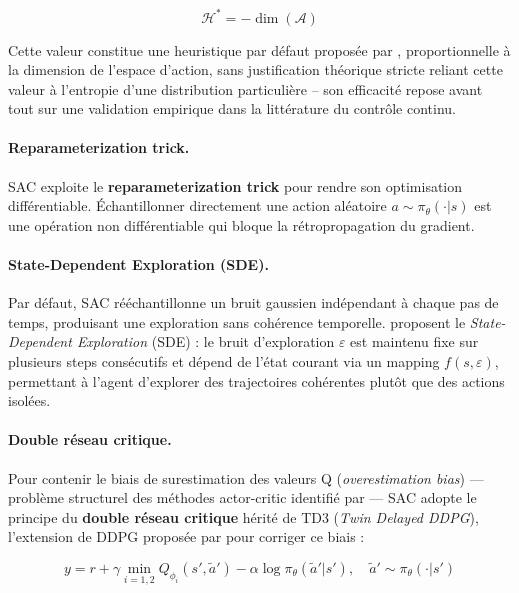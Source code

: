 \begin{equation}
    \mathcal{H}^* = -\dim(\mathcal{A})
\end{equation}
 
Cette valeur constitue une heuristique par défaut proposée par \textcite{haarnojaSoftActorCriticAlgorithms2019}, proportionnelle à la dimension de l'espace d'action, sans justification théorique stricte reliant cette valeur à l'entropie d'une distribution particulière -- son efficacité repose avant tout sur une validation empirique dans la littérature du contrôle continu.
 
\paragraph{Reparameterization trick.}
SAC exploite le \textbf{reparameterization trick} pour rendre son
optimisation différentiable. Échantillonner directement une action aléatoire
$a \sim \pi_\theta(\cdot|s)$ est une opération non différentiable qui bloque
la rétropropagation du gradient. 
 
\paragraph{State-Dependent Exploration (SDE).}
Par défaut, SAC rééchantillonne un bruit gaussien indépendant à chaque pas de temps, produisant une exploration sans cohérence temporelle. \textcite{raffinSmoothExplorationRobotic2021} proposent le \textit{State-Dependent Exploration} (SDE) : le bruit d'exploration $\varepsilon$ est maintenu fixe sur plusieurs steps consécutifs et dépend de l'état courant via un mapping $f(s, \varepsilon)$, permettant à l'agent d'explorer des trajectoires cohérentes plutôt que des actions isolées.
 
\paragraph{Double réseau critique.}
Pour contenir le biais de surestimation des valeurs Q
(\textit{overestimation bias}) --- problème structurel des méthodes
actor-critic identifié par \textcite{fujimotoAddressingFunctionApproximation2018}
--- SAC adopte le principe du \textbf{double réseau critique} hérité de
TD3 (\textit{Twin Delayed DDPG}), l'extension de DDPG proposée par
\textcite{fujimotoAddressingFunctionApproximation2018} pour corriger ce
biais :
 
\begin{equation}
    y = r + \gamma \min_{i=1,2} Q_{\phi_i}(s', \tilde{a}')
        - \alpha\log\pi_\theta(\tilde{a}'|s'),
    \quad \tilde{a}' \sim \pi_\theta(\cdot|s')
\end{equation}
 
